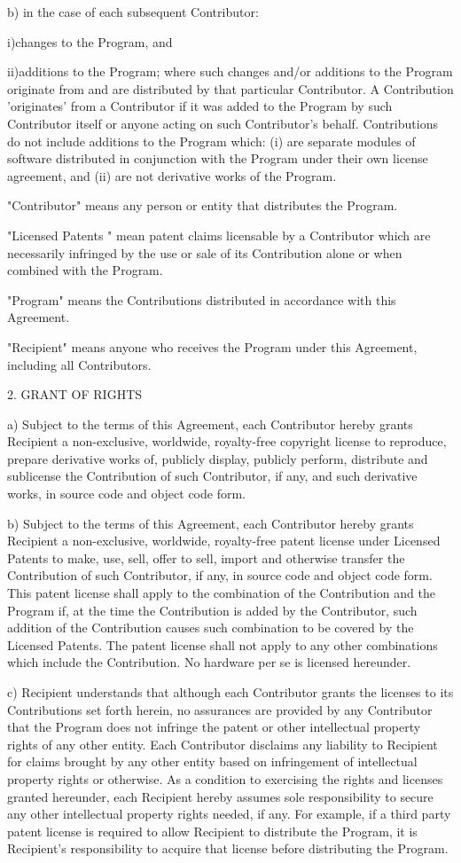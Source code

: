 b) in the case of each subsequent Contributor:

i)changes to the Program, and

ii)additions to the Program;
where such changes and/or additions to the Program originate
from and are distributed by that particular Contributor. A Contribution
'originates' from a Contributor if it was added to the Program
by such Contributor itself or anyone acting on such Contributor's
behalf. Contributions do not include additions to the Program
which: (i) are separate modules of software distributed in conjunction
with the Program under their own license agreement, and (ii)
are not derivative works of the Program.

"Contributor" means any person or entity that distributes the
Program.

"Licensed Patents " mean patent claims licensable by a Contributor
which are necessarily infringed by the use or sale of its Contribution
alone or when combined with the Program.

"Program" means the Contributions distributed in accordance with
this Agreement.

"Recipient" means anyone who receives the Program under this
Agreement, including all Contributors.


2. GRANT OF RIGHTS

a) Subject to the terms of this Agreement, each Contributor hereby
grants Recipient a non-exclusive, worldwide, royalty-free copyright
license to reproduce, prepare derivative works of, publicly display,
publicly perform, distribute and sublicense the Contribution
of such Contributor, if any, and such derivative works, in source
code and object code form.

b) Subject to the terms of this Agreement, each Contributor hereby
grants Recipient a non-exclusive, worldwide, royalty-free patent
license under Licensed Patents to make, use, sell, offer to sell,
import and otherwise transfer the Contribution of such Contributor,
if any, in source code and object code form. This patent license
shall apply to the combination of the Contribution and the Program
if, at the time the Contribution is added by the Contributor,
such addition of the Contribution causes such combination to
be covered by the Licensed Patents. The patent license shall
not apply to any other combinations which include the Contribution.
No hardware per se is licensed hereunder.

c) Recipient understands that although each Contributor grants
the licenses to its Contributions set forth herein, no assurances
are provided by any Contributor that the Program does not infringe
the patent or other intellectual property rights of any other
entity. Each Contributor disclaims any liability to Recipient
for claims brought by any other entity based on infringement
of intellectual property rights or otherwise. As a condition
to exercising the rights and licenses granted hereunder, each
Recipient hereby assumes sole responsibility to secure any other
intellectual property rights needed, if any. For example, if
a third party patent license is required to allow Recipient to
distribute the Program, it is Recipient's responsibility to acquire
that license before distributing the Program.

